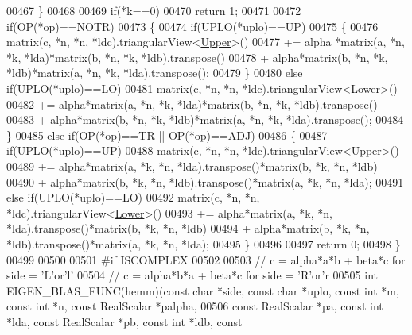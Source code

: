 \begin{DoxyCode}
00467   \}
00468 
00469   \textcolor{keywordflow}{if}(*k==0)
00470     \textcolor{keywordflow}{return} 1;
00471 
00472   \textcolor{keywordflow}{if}(OP(*op)==NOTR)
00473   \{
00474     \textcolor{keywordflow}{if}(UPLO(*uplo)==UP)
00475     \{
00476       matrix(c, *n, *n, *ldc).triangularView<\hyperlink{group__enums_gga39e3366ff5554d731e7dc8bb642f83cda6bcb58be3b8b8ec84859ce0c5ac0aaec}{Upper}>()
00477         += alpha *matrix(a, *n, *k, *lda)*matrix(b, *n, *k, *ldb).transpose()
00478         +  alpha*matrix(b, *n, *k, *ldb)*matrix(a, *n, *k, *lda).transpose();
00479     \}
00480     \textcolor{keywordflow}{else} \textcolor{keywordflow}{if}(UPLO(*uplo)==LO)
00481       matrix(c, *n, *n, *ldc).triangularView<\hyperlink{group__enums_gga39e3366ff5554d731e7dc8bb642f83cda891792b8ed394f7607ab16dd716f60e6}{Lower}>()
00482         += alpha*matrix(a, *n, *k, *lda)*matrix(b, *n, *k, *ldb).transpose()
00483         +  alpha*matrix(b, *n, *k, *ldb)*matrix(a, *n, *k, *lda).transpose();
00484   \}
00485   \textcolor{keywordflow}{else} \textcolor{keywordflow}{if}(OP(*op)==TR || OP(*op)==ADJ)
00486   \{
00487     \textcolor{keywordflow}{if}(UPLO(*uplo)==UP)
00488       matrix(c, *n, *n, *ldc).triangularView<\hyperlink{group__enums_gga39e3366ff5554d731e7dc8bb642f83cda6bcb58be3b8b8ec84859ce0c5ac0aaec}{Upper}>()
00489         += alpha*matrix(a, *k, *n, *lda).transpose()*matrix(b, *k, *n, *ldb)
00490         +  alpha*matrix(b, *k, *n, *ldb).transpose()*matrix(a, *k, *n, *lda);
00491     \textcolor{keywordflow}{else} \textcolor{keywordflow}{if}(UPLO(*uplo)==LO)
00492       matrix(c, *n, *n, *ldc).triangularView<\hyperlink{group__enums_gga39e3366ff5554d731e7dc8bb642f83cda891792b8ed394f7607ab16dd716f60e6}{Lower}>()
00493         += alpha*matrix(a, *k, *n, *lda).transpose()*matrix(b, *k, *n, *ldb)
00494         +  alpha*matrix(b, *k, *n, *ldb).transpose()*matrix(a, *k, *n, *lda);
00495   \}
00496 
00497   \textcolor{keywordflow}{return} 0;
00498 \}
00499 
00500 
00501 \textcolor{preprocessor}{#if ISCOMPLEX}
00502 
00503 \textcolor{comment}{// c = alpha*a*b + beta*c  for side = 'L'or'l'}
00504 \textcolor{comment}{// c = alpha*b*a + beta*c  for side = 'R'or'r}
00505 \textcolor{keywordtype}{int} EIGEN\_BLAS\_FUNC(hemm)(\textcolor{keyword}{const} \textcolor{keywordtype}{char} *side, \textcolor{keyword}{const} \textcolor{keywordtype}{char} *uplo, \textcolor{keyword}{const} \textcolor{keywordtype}{int} *m, \textcolor{keyword}{const} \textcolor{keywordtype}{int} *n, \textcolor{keyword}{const} RealScalar 
      *palpha,
00506                           \textcolor{keyword}{const} RealScalar *pa, \textcolor{keyword}{const} \textcolor{keywordtype}{int} *lda, \textcolor{keyword}{const} RealScalar *pb, \textcolor{keyword}{const} \textcolor{keywordtype}{int} *ldb, \textcolor{keyword}{const}

\end{DoxyCode}
